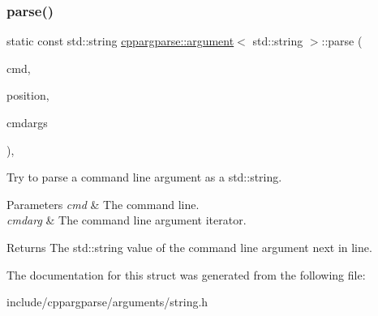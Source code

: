 \subsubsection{\texorpdfstring{parse()}{parse()}}
{\footnotesize\ttfamily static const std\+::string \hyperlink{structcppargparse_1_1argument}{cppargparse\+::argument}$<$ std\+::string $>$\+::parse (\begin{DoxyParamCaption}\item[{const types\+::\+Command\+Line\+\_\+t \&}]{cmd,  }\item[{const types\+::\+Command\+Line\+Position\+\_\+t \&}]{position,  }\item[{const types\+::\+Command\+Line\+Arguments\+\_\+t \&}]{cmdargs }\end{DoxyParamCaption})\hspace{0.3cm}{\ttfamily [inline]}, {\ttfamily [static]}}



Try to parse a command line argument as a std\+::string. 


\begin{DoxyParams}{Parameters}
{\em cmd} & The command line. \\
\hline
{\em cmdarg} & The command line argument iterator.\\
\hline
\end{DoxyParams}
\begin{DoxyReturn}{Returns}
The std\+::string value of the command line argument next in line. 
\end{DoxyReturn}


The documentation for this struct was generated from the following file\+:\begin{DoxyCompactItemize}
\item 
include/cppargparse/arguments/string.\+h\end{DoxyCompactItemize}
